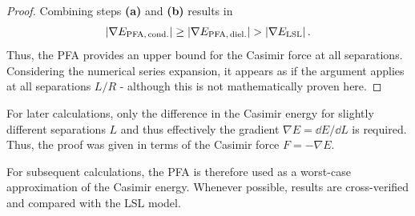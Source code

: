 \begin{proof}
  Combining steps \textbf{(a)} and \textbf{(b)} results in
  \begin{equation}
    \left\lvert\nabla E_\mathrm{PFA,\,cond.}\right\rvert \geq \left\lvert\nabla E_\mathrm{PFA,\,diel.}\right\rvert > \left\lvert\nabla E_\mathrm{LSL}\right\rvert .
  \end{equation}
  Thus, the PFA provides an upper bound for the Casimir force at all separations.
  Considering the numerical series expansion, it appears as if the argument applies at all separations $L/R$ - although this is not mathematically proven here.
\end{proof}
\begin{remark}
  For later calculations, only the difference in the Casimir energy for slightly different separations $L$ and thus effectively the gradient $\nabla E = \dd E / \dd L$ is required. Thus, the proof was given in terms of the Casimir force $F= -\nabla E$.
\end{remark}

For subsequent calculations, the PFA is therefore used as a worst-case approximation of the Casimir energy. Whenever possible, results are cross-verified and compared with the LSL model.